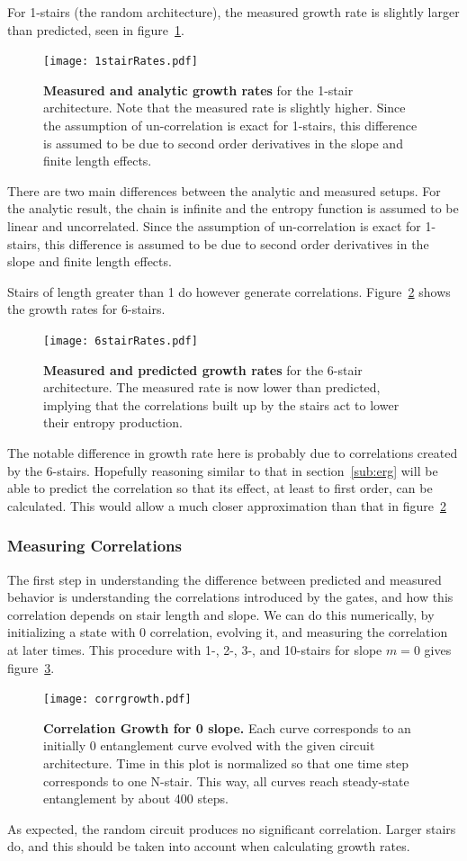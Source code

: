 For 1-stairs (the random architecture), the measured growth rate is slightly larger than predicted, seen in figure~\ref{fig:1stairRates}.
\begin{figure}
	\centering
	\texttt{[image: 1stairRates.pdf]}
	\caption{\textbf{Measured and analytic growth rates} for the 1-stair architecture. Note that the measured rate is slightly higher. Since the assumption of un-correlation is exact for 1-stairs, this difference is assumed to be due to second order derivatives in the slope and finite length effects.}
	\label{fig:1stairRates}
\end{figure}
There are two main differences between the analytic and measured setups. For the analytic result, the chain is infinite and the entropy function is assumed to be linear and uncorrelated. Since the assumption of un-correlation is exact for 1-stairs, this difference is assumed to be due to second order derivatives in the slope and finite length effects.

Stairs of length greater than 1 do however generate correlations. Figure~\ref{fig:6stairRates} shows the growth rates for 6-stairs. 
\begin{figure}
	\centering
	\texttt{[image: 6stairRates.pdf]}
	\caption{\textbf{Measured and predicted growth rates} for the 6-stair architecture. The measured rate is now lower than predicted, implying that the correlations built up by the stairs act to lower their entropy production.}
	\label{fig:6stairRates}
\end{figure}
The notable difference in growth rate here is probably due to correlations created by the 6-stairs. Hopefully reasoning similar to that in section~\ref{sub:erg} will be able to predict the correlation so that its effect, at least to first order, can be calculated. This would allow a much closer approximation than that in figure~\ref{fig:6stairRates}

\subsubsection{Measuring Correlations}  \label{subsub:correlations}

The first step in understanding the difference between predicted and measured behavior is understanding the correlations introduced by the gates, and how this correlation depends on stair length and slope. We can do this numerically, by initializing a state with 0 correlation, evolving it, and measuring the correlation at later times. This procedure with 1-, 2-, 3-, and 10-stairs for slope $m=0$ gives figure~\ref{fig:corrgrowth}.
\begin{figure}
	\centering
	\texttt{[image: corrgrowth.pdf]}
	\caption{\textbf{Correlation Growth for 0 slope.} Each curve corresponds to an initially 0 entanglement curve evolved with the given circuit architecture. Time in this plot is normalized so that one time step corresponds to one N-stair. This way, all curves reach steady-state entanglement by about 400 steps.
	}
	\label{fig:corrgrowth}
\end{figure}
As expected, the random circuit produces no significant correlation. Larger stairs do, and this should be taken into account when calculating growth rates. 


